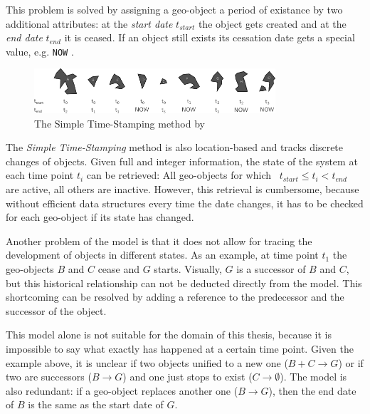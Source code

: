 This problem is solved by assigning a geo-object a period of existance by two additional attributes: at the \emph{start date} $t_{start}$ the object gets created and at the \emph{end date} $t_{end}$ it is ceased. If an object still exists its cessation date gets a special value, e.g. \texttt{NOW}
\cite{hunter90timestamping}.

\begin{figure}[ht]
  \centering
  \includegraphics[width=0.8\textwidth]{graphics/basics/stdm/simple_time_stamping}
  \caption{The Simple Time-Stamping method by \cite{hunter90timestamping}}
  \label{fig:simple_time_stamping}
\end{figure}

The \emph{Simple Time-Stamping} method is also location-based and tracks discrete changes of objects. Given full and integer information, the state of the system at each time point $t_i$ can be retrieved: All geo-objects for which ~$t_{start} \leq t_i < t_{end}$~ are active, all others are inactive. However, this retrieval is cumbersome, because without efficient data structures every time the date changes, it has to be checked for each geo-object if its state has changed.

Another problem of the model is that it does not allow for tracing the development of objects in different states. As an example, at time point $t_1$ the geo-objects $B$ and $C$ cease and $G$ starts. Visually, $G$ is a successor of $B$ and $C$, but this historical relationship can not be deducted directly from the model. This shortcoming can be resolved by adding a reference to the predecessor and the successor of the object.

This model alone is not suitable for the domain of this thesis, because it is impossible to say what exactly has happened at a certain time point. Given the example above, it is unclear if two objects unified to a new one ($B+C \to G$) or if two are successors ($B \to G$) and one just stops to exist ($C \to \emptyset$). The model is also redundant: if a geo-object replaces another one ($B \to G$), then the end date of $B$ is the same as the start date of $G$.




